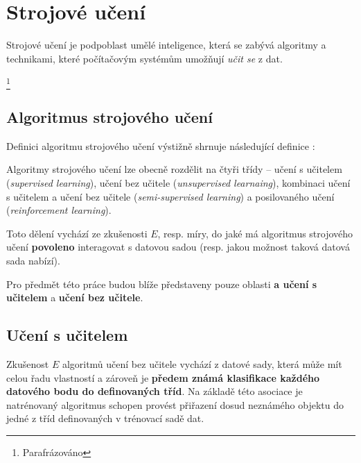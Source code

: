 \section{Strojové učení}
Strojové učení je podpoblast umělé inteligence, která se zabývá algoritmy a technikami, které počítačovým systémům umožňují \emph{učit se} z dat.
\begin{displayquote}
     \cite{Samuel1967}\footnote{Parafrázováno}
\end{displayquote}
\subsection{Algoritmus strojového učení}
\label{sec:machine_learning_algorithm}
Definici algoritmu strojového učení výstižně shrnuje následující definice \cite[str. 2]{Mitchell1997}:
\begin{displayquote}
\end{displayquote}
Algoritmy strojového učení lze obecně rozdělit na čtyři třídy – učení s učitelem (\emph{supervised learning}),
učení bez učitele (\emph{unsupervised learnaing}), kombinaci učení s učitelem a učení bez učitele (\emph{semi-supervised learning}) a posilovaného učení (\emph{reinforcement learning}).

Toto dělení vychází ze zkušenosti $E$, resp. míry, do jaké má algoritmus strojového učení \textbf{povoleno} interagovat s datovou sadou (resp. jakou možnost taková datová sada nabízí). \cite{Goodfellow2016}

Pro předmět této práce budou blíže představeny pouze oblasti \textbf{a učení s učitelem} a \textbf{učení bez učitele}.
\subsection{Učení s učitelem}
\label{sec:supervised_learning}
Zkušenost $E$ algoritmů učení bez učitele vychází z datové sady, která může mít celou řadu vlastností a zároveň je \textbf{předem známá klasifikace každého datového bodu do definovaných tříd}.
Na základě této asociace je natrénovaný algoritmus schopen provést přiřazení dosud neznámého objektu do jedné z tříd definovaných v trénovací sadě dat.

